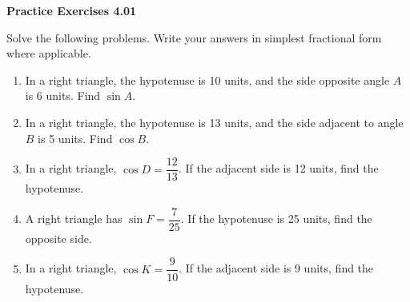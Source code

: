 \vspace{0.3ex}
\noindent\textbf{Practice Exercises 4.01}

\vspace{0.2ex}

Solve the following problems. Write your answers in simplest fractional form where applicable.

\begin{enumerate}
    \item In a right triangle, the hypotenuse is 10 units, and the side opposite angle $A$ is 6 units. Find $\sin A$.
    \item In a right triangle, the hypotenuse is 13 units, and the side adjacent to angle $B$ is 5 units. Find $\cos B$.
    \item In a right triangle, $\cos D = \dfrac{12}{13}$. If the adjacent side is 12 units, find the hypotenuse.
    \item A right triangle has $\sin F = \dfrac{7}{25}$. If the hypotenuse is 25 units, find the opposite side.
    \item In a right triangle, $\cos K = \dfrac{9}{10}$. If the adjacent side is 9 units, find the hypotenuse.
 \end{enumerate}
    
